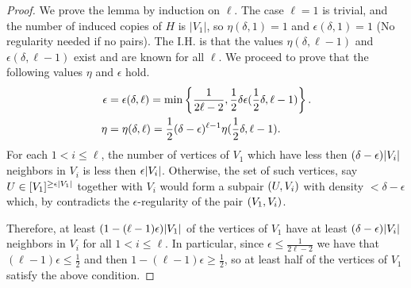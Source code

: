 \begin{lemma}
\begin{proof}
                We prove the lemma by induction on $\ell$.
                The case $\ell=1$ is trivial, and the number of induced copies of $H$ is $|V_1|$, so $\eta(\delta, 1) = 1$ and
                $\epsilon(\delta, 1) = 1$ (No regularity needed if no pairs).
                The I.H. is that the values $\eta(\delta, \ell-1)$ and $\epsilon(\delta, \ell-1)$ exist and are known for all
                $\ell$.
                We proceed to prove that the following values $\eta$ and $\epsilon$ hold.
                \begin{align*}
                    \epsilon &= \epsilon(\delta, \ell)
                        = \min \left\{ \frac{1}{2\ell - 2}, \frac{1}{2} \delta \epsilon(\frac{1}{2}\delta, \ell-1) \right\}. \\
                    \eta &= \eta(\delta, \ell)
                        = \frac{1}{2} (\delta - \epsilon)^{\ell-1} \eta(\frac{1}{2}\delta, \ell-1).
                \end{align*}
                For each $1 < i \leq \ell$, the number of vertices of $V_1$ which have less then
                $(\delta - \epsilon) | V_i |$ neighbors in $V_i$ is less then $\epsilon | V_i |$.
                Otherwise, the set of such vertices, say $U \in [V_1]^{\geq \epsilon | V_1 |}$ together with $V_i$
                would form a subpair $( U, V_i )$ with density $< \delta - \epsilon$ which, by
                 contradicts the $\epsilon$-regularity of the pair $( V_1, V_i )$.

                Therefore, at least $(1 - (\ell -1) \epsilon) | V_1 |$ of the vertices of $V_1$ have at least
                $(\delta - \epsilon) | V_i |$ neighbors in $V_i$ for all $1 < i \leq \ell$.
                In particular, since $\epsilon \leq \frac{1}{2\ell - 2}$ we have that $(\ell - 1) \epsilon \leq \frac{1}{2}$
                and then $1 - (\ell - 1) \epsilon \geq \frac{1}{2}$, so at least half of the vertices of $V_1$ satisfy the
                above condition.


\end{proof}
\end{lemma}
